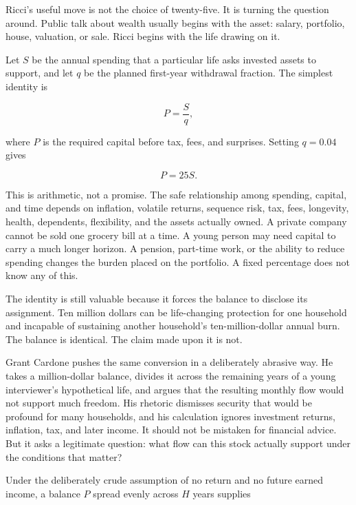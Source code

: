 Ricci's useful move is not the choice of twenty-five. It is turning the
question around. Public talk about wealth usually begins with the asset:
salary, portfolio, house, valuation, or sale. Ricci begins with the life drawing
on it.

Let $S$ be the annual spending that a particular life asks invested assets to
support, and let $q$ be the planned first-year withdrawal fraction. The
simplest identity is

\begin{equation}
P=\frac{S}{q},
\end{equation}

where $P$ is the required capital before tax, fees, and surprises. Setting
$q=0.04$ gives

\begin{equation}
P=25S.
\end{equation}

This is arithmetic, not a promise. The safe relationship among spending,
capital, and time depends on inflation, volatile returns, sequence risk, tax,
fees, longevity, health, dependents, flexibility, and the assets actually
owned. A private company cannot be sold one grocery bill at a time. A young
person may need capital to carry a much longer horizon. A pension, part-time
work, or the ability to reduce spending changes the burden placed on the
portfolio. A fixed percentage does not know any of this.

The identity is still valuable because it forces the balance to disclose its
assignment. Ten million dollars can be life-changing protection for one
household and incapable of sustaining another household's ten-million-dollar
annual burn. The balance is identical. The claim made upon it is not.

Grant Cardone pushes the same conversion in a deliberately abrasive way. He
takes a million-dollar balance, divides it across the remaining years of a
young interviewer's hypothetical life, and argues that the resulting monthly
flow would not support much freedom. His rhetoric dismisses security that
would be profound for many households, and his calculation ignores investment
returns, inflation, tax, and later income. It should not be mistaken for
financial advice. But it asks a legitimate question: what flow can this stock
actually support under the conditions that matter?

Under the deliberately crude assumption of no return and no future earned
income, a balance $P$ spread evenly across $H$ years supplies

